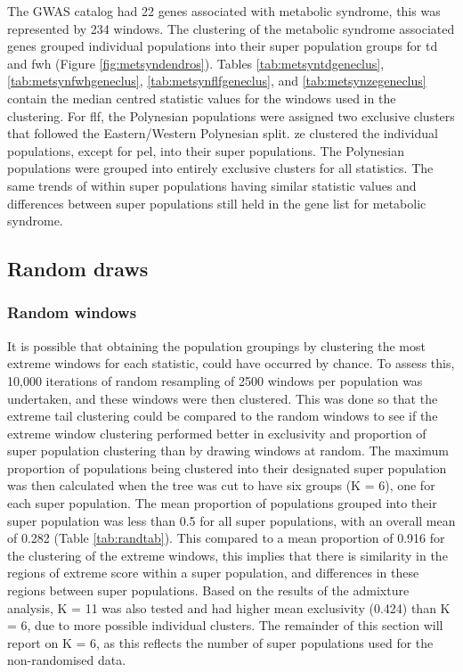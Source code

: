 \documentclass[twoside,openright]{report}
\begin{document}
The GWAS catalog had 22 genes associated with metabolic syndrome, this
was represented by 234 windows. The clustering of the metabolic syndrome
associated genes grouped individual populations into their super
population groups for \gls{td} and \gls{fwh} (Figure
\ref{fig:metsyndendros}). Tables \ref{tab:metsyntdgeneclus},
\ref{tab:metsynfwhgeneclus}, \ref{tab:metsynflfgeneclus}, and
\ref{tab:metsynzegeneclus} contain the median centred statistic values
for the windows used in the clustering. For \gls{flf}, the Polynesian
populations were assigned two exclusive clusters that followed the
Eastern/Western Polynesian split. \Gls{ze} clustered the individual
populations, except for \gls{pel}, into their super populations. The
Polynesian populations were grouped into entirely exclusive clusters for
all statistics. The same trends of within super populations having
similar statistic values and differences between super populations still
held in the gene list for metabolic syndrome.

\subsection{Random draws}\label{random-draws}

\subsubsection{Random windows}\label{random-windows}

It is possible that obtaining the population groupings by clustering the
most extreme windows for each statistic, could have occurred by chance.
To assess this, 10,000 iterations of random resampling of 2500 windows
per population was undertaken, and these windows were then clustered.
This was done so that the extreme tail clustering could be compared to
the random windows to see if the extreme window clustering performed
better in exclusivity and proportion of super population clustering than
by drawing windows at random. The maximum proportion of populations
being clustered into their designated super population was then
calculated when the tree was cut to have six groups (K = 6), one for
each super population. The mean proportion of populations grouped into
their super population was less than 0.5 for all super populations, with
an overall mean of 0.282 (Table \ref{tab:randtab}). This compared to a
mean proportion of 0.916 for the clustering of the extreme windows, this
implies that there is similarity in the regions of extreme score within
a super population, and differences in these regions between super
populations. Based on the results of the admixture analysis, K = 11 was
also tested and had higher mean exclusivity (0.424) than K = 6, due to
more possible individual clusters. The remainder of this section will
report on K = 6, as this reflects the number of super populations used
for the non-randomised data.
\end{document}
